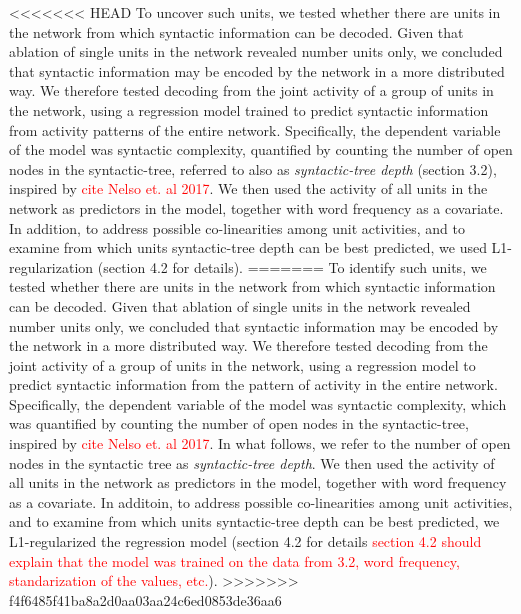 <<<<<<< HEAD
To uncover such units, we tested whether there are units in the network from which syntactic information can be decoded. Given that ablation of single units in the network revealed number units only, we concluded that syntactic information may be encoded by the network in a more distributed way. We therefore tested decoding from the joint activity of a group of units in the network, using a regression model trained to predict syntactic information from activity patterns of the entire network. Specifically, the dependent variable of the model was syntactic complexity, quantified by counting the number of open nodes in the syntactic-tree, referred to also as \textit{syntactic-tree depth} (section 3.2), inspired by \textcolor{red}{cite Nelso et. al 2017}. We then used the activity of all units in the network as predictors in the model, together with word frequency as a covariate. In addition, to address possible co-linearities among unit activities, and to examine from which units syntactic-tree depth can be best predicted, we used L1-regularization (section 4.2 for details). 
=======
To identify such units, we tested whether there are units in the network from which syntactic information can be decoded. Given that ablation of single units in the network revealed number units only, we concluded that syntactic information may be encoded by the network in a more distributed way. We therefore tested decoding from the joint activity of a group of units in the network, using a regression model to predict syntactic information from the pattern of activity in the entire network. Specifically, the dependent variable of the model was syntactic complexity, which was quantified by counting the number of open nodes in the syntactic-tree, inspired by \textcolor{red}{cite Nelso et. al 2017}. In what follows, we refer to the number of open nodes in the syntactic tree as \textit{syntactic-tree depth}. We then used the activity of all units in the network as predictors in the model, together with word frequency as a covariate. In additoin, to address possible co-linearities among unit activities, and to examine from which units syntactic-tree depth can be best predicted, we L1-regularized the regression model (section 4.2 for details \textcolor{red}{section 4.2 should explain that the model was trained on the data from 3.2, word frequency, standarization of the values, etc.}). 
>>>>>>> f4f6485f41ba8a2d0aa03aa24c6ed0853de36aa6

